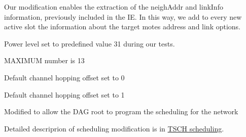 \begin{DoxyRefList}
\item[\label{_l_k_n_code_edits__LKN_code_edits000019}%
\hypertarget{_l_k_n_code_edits__LKN_code_edits000019}{}%
Member \hyperlink{process_i_e_8h_a41d90fd25e8ce294b9d7632d43089c80}{process\+I\+E\+\_\+retrieve\+Slotframe\+Link\+IE} (\hyperlink{struct_open_queue_entry__t}{Open\+Queue\+Entry\+\_\+t} $\ast$pkt, uint8\+\_\+t $\ast$ptr)]Our modification enables the extraction of the neigh\+Addr and link\+Info information, previously included in the IE. In this way, we add to every new active slot the information about the target mote\textquotesingle{}s address and link options. 
\item[\label{_l_k_n_code_edits__LKN_code_edits000001}%
\hypertarget{_l_k_n_code_edits__LKN_code_edits000001}{}%
Member \hyperlink{group__radio_gaf181029cf06b94f0f4ceaafec1c3f209}{radio\+\_\+reset} (void)]Power level set to predefined value 31 during our tests.  
\item[\label{_l_k_n_code_edits__LKN_code_edits000025}%
\hypertarget{_l_k_n_code_edits__LKN_code_edits000025}{}%
Member \hyperlink{group___schedule_ga299d7e29eb70888b68ace83fd3f1a8df}{S\+C\+H\+E\+D\+U\+L\+E\+\_\+\+M\+I\+N\+I\+M\+A\+L\+\_\+6\+T\+I\+S\+C\+H\+\_\+\+A\+C\+T\+I\+V\+E\+\_\+\+C\+E\+L\+LS} ]M\+A\+X\+I\+M\+UM number is 13  
\item[\label{_l_k_n_code_edits__LKN_code_edits000027}%
\hypertarget{_l_k_n_code_edits__LKN_code_edits000027}{}%
Member \hyperlink{group___schedule_ga485a603a3e03059901c4fc5fc968a1e9}{S\+C\+H\+E\+D\+U\+L\+E\+\_\+\+M\+I\+N\+I\+M\+A\+L\+\_\+6\+T\+I\+S\+C\+H\+\_\+\+C\+H\+A\+N\+N\+E\+L\+O\+F\+F\+S\+ET} ]Default channel hopping offset set to 0  
\item[\label{_l_k_n_code_edits__LKN_code_edits000026}%
\hypertarget{_l_k_n_code_edits__LKN_code_edits000026}{}%
Member \hyperlink{group___schedule_ga62c64cb1c9bbbb2927f358c14535fb7f}{S\+C\+H\+E\+D\+U\+L\+E\+\_\+\+M\+I\+N\+I\+M\+A\+L\+\_\+6\+T\+I\+S\+C\+H\+\_\+\+S\+L\+O\+T\+O\+F\+F\+S\+ET} ]Default channel hopping offset set to 1  
\item[\label{_l_k_n_code_edits__LKN_code_edits000020}%
\hypertarget{_l_k_n_code_edits__LKN_code_edits000020}{}%
Member \hyperlink{group___schedule_gade694f312044f8bff151d58c7976d067}{schedule\+\_\+start\+D\+A\+Groot} (void)]Modified to allow the D\+AG root to program the scheduling for the network 
\item[\label{_l_k_n_code_edits__LKN_code_edits000022}%
\hypertarget{_l_k_n_code_edits__LKN_code_edits000022}{}%
Member \hyperlink{group___schedule_gaea12b586ec3f6de3ffcfff93da574345}{S\+L\+O\+T\+F\+R\+A\+M\+E\+\_\+\+L\+E\+N\+G\+TH} ]Detailed descriprion of scheduling modification is in \hyperlink{_l_k_n_contribution_TSCH_scheduling}{T\+S\+CH scheduling}. 

\end{DoxyRefList}
